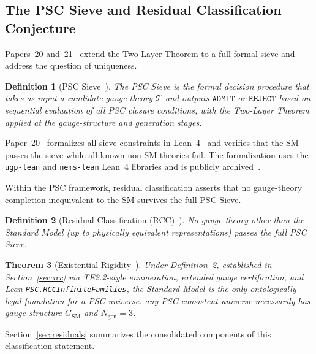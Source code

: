 \documentclass[11pt,twocolumn]{article}
\newtheorem{theorem}{Theorem}[section]
\newtheorem{definition}[theorem]{Definition}
\theoremstyle{remark}
\begin{document}
\subsection{The PSC Sieve and Residual Classification Conjecture}
\label{sec:sieve}

Papers~20 and~21~\cite{SpivackGaugeRigidity,SpivackExistentialRigidity}
extend the Two-Layer Theorem to a full formal sieve and address the
question of uniqueness.

\begin{definition}[PSC Sieve~{\cite{SpivackGaugeRigidity}}]
\label{def:sieve}
The \emph{PSC Sieve} is the formal decision procedure that takes as
input a candidate gauge theory $\mathcal{T}$ and outputs
$\mathtt{ADMIT}$ or $\mathtt{REJECT}$ based on sequential evaluation
of all PSC closure conditions, with the Two-Layer Theorem applied
at the gauge-structure and generation stages.
\end{definition}

Paper~20~\cite{SpivackGaugeRigidity} formalizes all sieve constraints
in Lean~4~\cite{SpivackUGPFormalization} and verifies that the SM
passes the sieve while all known non-SM theories fail.
The formalization uses the \texttt{ugp-lean} and
\texttt{nems-lean} Lean~4 libraries and is publicly
archived~\cite{SpivackUGPFormalization}.

Within the PSC framework, residual classification asserts that no gauge-theory completion inequivalent to the SM survives the full PSC Sieve.

\begin{definition}[Residual Classification (RCC)~{\cite{SpivackGaugeRigidity}}]
\label{def:rcc}
No gauge theory other than the Standard Model (up to physically
equivalent representations) passes the full PSC Sieve.
\end{definition}

\begin{theorem}[Existential Rigidity~{\cite{SpivackExistentialRigidity,ugp-lean}}]
\label{thm:existential}
Under Definition~\ref{def:rcc}, established in Section~\ref{sec:rcc}
via TE2.2-style enumeration, extended gauge certification, and Lean
\texttt{PSC.RCCInfiniteFamilies}, the Standard Model is the only ontologically legal foundation for a PSC universe:
any PSC-consistent universe necessarily has gauge structure
$G_{\mathrm{SM}}$ and $N_{\mathrm{gen}}=3$.
\end{theorem}

Section~\ref{sec:residuals} summarizes the consolidated components of this classification statement.
\end{document}
